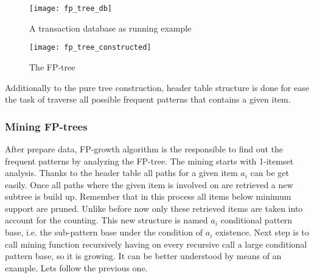 \begin{figure}
  \centering
  \texttt{[image: fp\_tree\_db]}
  \caption{A transaction database as running example}
  \label{fig:fp_tree_db}
\end{figure}

\begin{figure}
  \centering
  \texttt{[image: fp\_tree\_constructed]}
  \caption{The FP-tree}
  \label{fig:fp_tree_constructed}
\end{figure}

Additionally to the pure tree construction, header table structure is done for
ease the task of traverse all possible frequent patterns that contains a given
item. 

\subsubsection{Mining FP-trees}

After prepare data, FP-growth algorithm is the responsible to find out the
frequent patterns by analyzing the FP-tree. The mining starts with 1-itemset
analysis. Thanks to the header table all paths for a given item $a_{i}$ can be get
easily. Once all paths where the given item is involved on are retrieved a new 
subtree is build up. Remember that in this process all items below minimum support 
are pruned. Unlike before now only these retrieved items are taken into account 
for the counting. This new structure is named $a_{i}$ conditional pattern base,
i.e. the sub-pattern base under the condition of $a_{i}$ existence. Next step is
to call mining function recursively having on every recursive call a large
conditional pattern base, so it is growing. It can be better understood by means
of an example. Lets follow the previous one.

